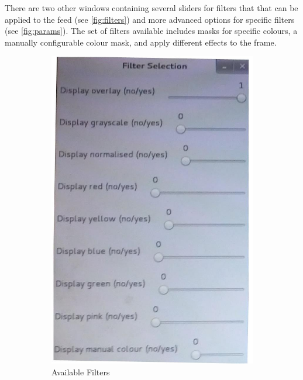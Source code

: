 There are two other windows containing several sliders for filters that that can be applied to the feed (see \autoref{fig:filters}) and more advanced options for specific filters (see \autoref{fig:params}). The set of filters available includes masks for specific colours, a manually configurable colour mask, and apply different effects to the frame.


\begin{figure}[H]
\centering
\begin{subfigure}{.5\textwidth}
\centering
\includegraphics[scale=0.2]{vision_filters}
\caption{Available Filters}
\label{fig:filters}
\end{subfigure}%
\begin{subfigure}{.5\textwidth}
\centering

\end{subfigure}
\end{figure}
